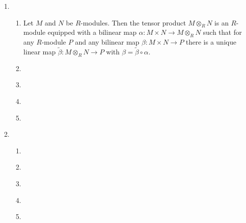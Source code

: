 \documentclass{article}
\begin{document}
\begin{enumerate}[style=nextline,label={Problem (\arabic*)}]
{\begin{enumerate}[label={(\alph*)}]
{\[\begin{array}{>{\displaystyle}c}
\end{array}
\]
is an isomorphism.
\par
Clearly, $\mathbb{C}[t^3, t^5]$ is an integral domain but not a field. Hence $\langle x^3 - y^5 \rangle \subseteq \mathbb{C}[x, y]$ is a prime ideal but not a maximal ideal.
}
\end{enumerate}
}
\item {
\begin{enumerate}[label={(\alph*)}]
\item {
Let $M$ and $N$ be $R$-modules. Then the tensor product $M \otimes_R N$ is an $R$-module equipped with a bilinear map $\alpha: M \times N \to M \otimes_R N$ such that for any $R$-module $P$ and any bilinear map $\beta: M \times N \to P$ there is a unique linear map $\tilde{\beta}: M \otimes_R N \to P$ with $\beta = \tilde{\beta} \circ \alpha$.
\begin{center}
\end{center}
}
\item {
}
\item {
}
\item {
}
\item {
}
\end{enumerate}
}
\item {
\begin{enumerate}[label={(\alph*)}]
\item {
}
\item {
}
\item {
}
\item {
}
\item {
}
\end{enumerate}
}
\end{enumerate}
\end{document}
